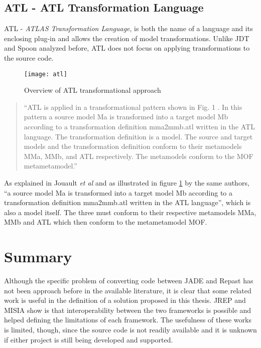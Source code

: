 \subsection{ATL - ATL Transformation Language }
	ATL - \emph{ATLAS Transformation Language}, is both the name of a language and its enclosing plug-in and allows the creation of model transformations. Unlike JDT and Spoon analyzed before, ATL does not focus on applying transformations to the source code.

	\begin{figure}[h]
	  \begin{center}
	    \leavevmode
	    \texttt{[image: atl]}
	    \caption{Overview of ATL transformational approach \cite{jouault2006transforming}}
	    \label{fig:so-atl-wow}
	  \end{center}
	\end{figure}

	\begin{quote}
		``ATL is applied in a transformational pattern shown in Fig. 1 . In this pattern a source model Ma is transformed into a target model Mb according to a transformation definition mma2mmb.atl written in the ATL language. The transformation definition is a model. The source and target models and the transformation definition conform to their metamodels MMa, MMb, and ATL respectively. The metamodels conform to the MOF metametamodel.''
	\end{quote}

	As explained in Jouault \emph{et al} and as illustrated in figure \ref{fig:so-atl-wow} by the same authors, ``a source model Ma is transformed into a target model Mb according to a transformation definition mma2mmb.atl written in the ATL language'', which is also a model itself. The three must conform to their respective metamodels MMa, MMb and ATL which then conform to the metametamodel MOF.


\section{Summary}
Although the specific problem of converting code between JADE and Repast has not been approach before in the available literature, it is clear that some related work is useful in the definition of a solution proposed in this thesis. JREP and MISIA show is that interoperability between the two frameworks is possible and helped defining the limitations of each framework. The usefulness of these works is limited, though, since the source code is not readily available and it is unknown if either project is still being developed and supported.

